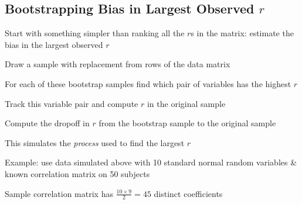 \subsection{Bootstrapping Bias in Largest Observed $r$}
\bi
\item Start with something simpler than ranking all the $r$s in the matrix: estimate the bias in the largest observed $r$
\item Draw a sample with replacement from rows of the data matrix
\item For each of these bootstrap samples find which pair of variables has the highest $r$
\item Track this variable pair and compute $r$ in the original sample
\item Compute the dropoff in $r$ from the bootstrap sample to the original sample
\item This simulates the \emph{process} used to find the largest $r$
\item Example: use data simulated above with 10 standard normal random variables \& known correlation matrix on 50 subjects
\item Sample correlation matrix has $\frac{10 \times 9}{2} = 45$ distinct coefficients
